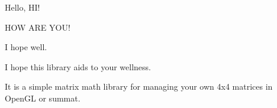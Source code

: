 Hello, H\-I!

H\-O\-W A\-R\-E Y\-O\-U!

I hope well.

I hope this library aids to your wellness.

It is a simple matrix math library for managing your own 4x4 matrices in Open\-G\-L or summat. 